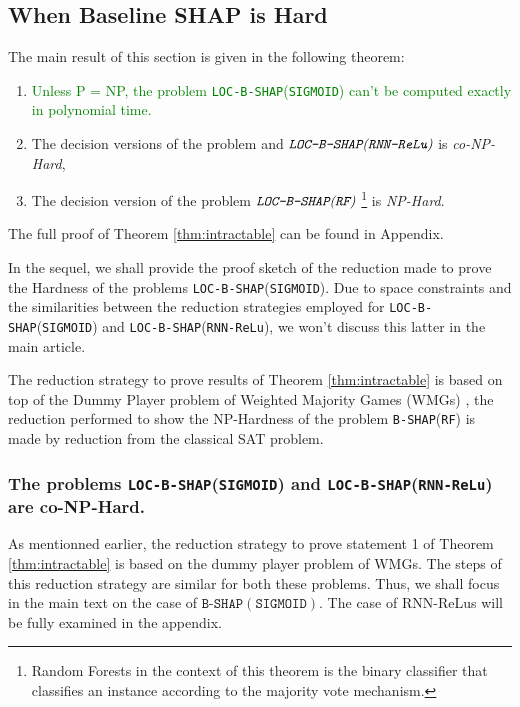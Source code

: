 \subsection{When Baseline SHAP is Hard} \label{subsec:baseline}
The main result of this section is given in the following theorem:
\begin{theorem} \label{thm:intractable}
\begin{enumerate}
    \item \textcolor{green}{Unless P = NP, the problem \texttt{LOC-B-SHAP}(\texttt{SIGMOID}) can't be computed exactly in polynomial time.}
    \item The decision versions of the problem  and $\emph{\texttt{LOC-B-SHAP}(\texttt{RNN-ReLu})}$ is \emph{co-NP-Hard},
    \item The decision version of the problem $\emph{\texttt{LOC-B-SHAP}(\texttt{RF})}$ \footnote{Random Forests in the context of this theorem is the binary classifier that classifies an instance according to the majority vote mechanism.} is \emph{NP-Hard}.
    \end{enumerate}
\end{theorem}

The full proof of Theorem \ref{thm:intractable} can be found in Appendix. 

In the sequel, we shall provide the proof sketch of the reduction made to prove  the Hardness of the problems \texttt{LOC-B-SHAP}(\texttt{SIGMOID}). Due to space constraints and the similarities between the reduction strategies employed for \texttt{LOC-B-SHAP}(\texttt{SIGMOID}) and \texttt{LOC-B-SHAP}(\texttt{RNN-ReLu}), we won't discuss this latter in the main article.

The reduction strategy to prove results of Theorem \ref{thm:intractable} is based on top of the Dummy Player problem of Weighted Majority Games (WMGs) \cite{freixas2011complexity}, the reduction performed to show the NP-Hardness of the problem \texttt{B-SHAP}(\texttt{RF}) is made by reduction from the classical SAT problem.
\subsubsection{The problems \texttt{LOC-B-SHAP}(\texttt{SIGMOID}) and  \texttt{LOC-B-SHAP}(\texttt{RNN-ReLu}) are co-NP-Hard.}
As mentionned earlier, the reduction strategy to prove statement 1 of Theorem \ref{thm:intractable} is based on the dummy player problem of WMGs. The steps of this reduction strategy are similar for both these problems. Thus, we shall focus in the main text on the case of $\texttt{B-SHAP}(\texttt{SIGMOID})$. The case of RNN-ReLus will be fully examined in the appendix. 

